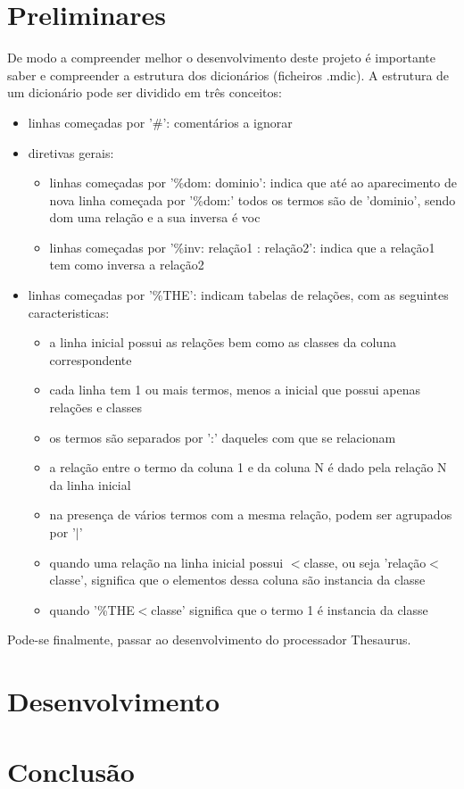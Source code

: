 \documentclass{llncs}
\begin{document}
\section{Preliminares}
De modo a compreender melhor o desenvolvimento deste projeto é importante saber e compreender a estrutura dos dicionários (ficheiros .mdic). 
A estrutura de um dicionário pode ser dividido em três conceitos:
\begin{itemize}
    \item linhas começadas por '\#': comentários a ignorar
    \item diretivas gerais:
        \begin{itemize}
            \item linhas começadas por '\%dom: dominio': indica que até ao aparecimento de nova linha começada por '\%dom:' todos os termos são de 'dominio', sendo dom uma relação e a sua inversa é voc
            \item linhas começadas por '\%inv: relação1 : relação2': indica que a relação1 tem como inversa a relação2
        \end{itemize}
    \item linhas começadas por '\%THE': indicam tabelas de relações, com as seguintes caracteristicas:
        \begin{itemize}
            \item a linha inicial possui as relações bem como as classes da coluna correspondente
            \item cada linha tem 1 ou mais termos, menos a inicial que possui apenas relações e classes
            \item os termos são separados por ':' daqueles com que se relacionam
            \item a relação entre o termo da coluna 1 e da coluna N é dado pela relação N da linha inicial
            \item na presença de vários termos com a mesma relação, podem ser agrupados por '$|$'
            \item quando uma relação na linha inicial possui $<$classe, ou seja 'relação$<$classe', significa que o elementos dessa coluna são instancia da classe
            \item quando '\%THE$<$classe' significa que o termo 1 é instancia da classe
        \end{itemize}
\end{itemize}
Pode-se finalmente, passar ao desenvolvimento do processador Thesaurus.

\section{Desenvolvimento}

\section{Conclusão}
\end{document}

